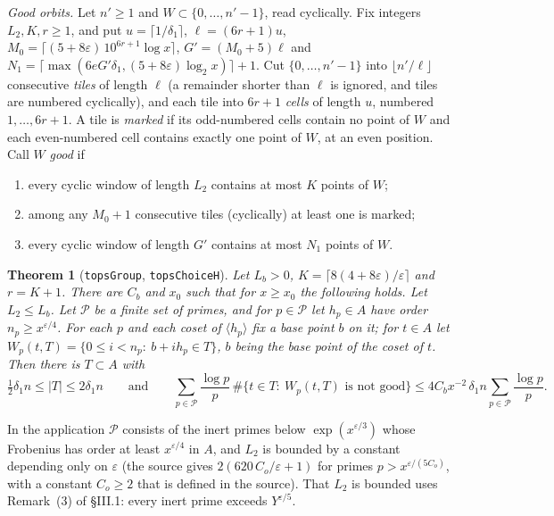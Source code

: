 \documentclass[11pt,letterpaper]{article}
\newtheorem{theorem}{Theorem}[section]
\begin{document}
\emph{Good orbits.} Let $n'\ge1$ and $W\subset\{0,\dots,n'-1\}$, read cyclically. Fix integers $L_2,K,r\ge1$,
and put $u=\lceil1/\delta_1\rceil$, $\ell=(6r+1)u$,
$M_0=\lceil(5+8\varepsilon)\,10^{6r+1}\log x\rceil$, $G'=(M_0+5)\ell$ and
$N_1=\lceil\max(6eG'\delta_1,(5+8\varepsilon)\log_2x)\rceil+1$. Cut $\{0,\dots,n'-1\}$ into $\lfloor n'/\ell\rfloor$ consecutive
\emph{tiles} of length $\ell$ (a remainder shorter than $\ell$ is ignored, and tiles are numbered cyclically), and each tile into $6r+1$ \emph{cells} of length $u$, numbered $1,\dots,6r+1$. A tile is \emph{marked}
if its odd-numbered cells contain no point of $W$ and each even-numbered cell contains exactly one point of
$W$, at an even position. Call $W$ \emph{good} if
\begin{enumerate}[label=\textup{(G\arabic*)},leftmargin=2.8em]
\item every cyclic window of length $L_2$ contains at most $K$ points of $W$;
\item among any $M_0+1$ consecutive tiles (cyclically) at least one is marked;
\item every cyclic window of length $G'$ contains at most $N_1$ points of $W$.
\end{enumerate}

\begin{theorem}[\texttt{topsGroup}, \texttt{topsChoiceH}]\label{thm:T}
Let $L_b>0$, $K=\lceil8(4+8\varepsilon)/\varepsilon\rceil$ and $r=K+1$.
There are $C_b$ and $x_0$ such that for $x\ge x_0$ the following holds. Let $L_2\le L_b$. Let $\mathcal P$ be
a finite set of primes, and for $p\in\mathcal P$ let $h_p\in A$ have order $n_p\ge x^{\varepsilon/4}$. For each
$p$ and each coset of $\langle h_p\rangle$ fix a base point $b$ on it; for $t\in A$ let
$W_p(t,T)=\{0\le i<n_p:\ b+ih_p\in T\}$, $b$ being the base point of the coset of $t$. Then there is
$T\subset A$ with
\begin{equation}\label{D:142}
 \tfrac12\delta_1n\le|T|\le2\delta_1n\qquad\text{and}\qquad
 \sum_{p\in\mathcal P}\frac{\log p}p\,\#\{t\in T:\ W_p(t,T)\text{ is not good}\}
 \le4C_bx^{-2}\,\delta_1n\sum_{p\in\mathcal P}\frac{\log p}p .
\end{equation}
\end{theorem}

\noindent In the application $\mathcal P$ consists of the inert primes below $\exp(x^{\varepsilon/3})$ whose
Frobenius has order at least $x^{\varepsilon/4}$ in $A$, and $L_2$ is bounded by a constant depending only on $\varepsilon$ (the source gives $2(620\,C_o/\varepsilon+1)$ for primes $p>x^{\varepsilon/(5C_o)}$, with a constant $C_o\ge2$ that is defined in the source). That $L_2$ is
bounded uses Remark~(3) of \S III.1: every inert prime exceeds $Y^{\varepsilon/5}$.
\end{document}
